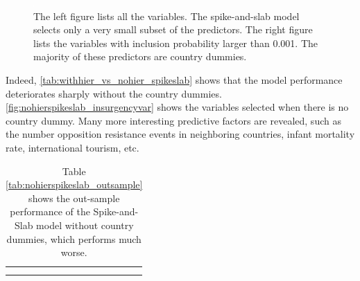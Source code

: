\documentclass{article}
\begin{document}
\begin{figure}[H]
\includegraphics[width=\textwidth]{fig/spikeslab_insurgencyvar}
\caption{The left figure lists all the variables. The spike-and-slab model selects only a very small subset of the predictors. The right figure lists the variables with inclusion probability larger than 0.001. The majority of these predictors are country dummies.}
\label{fig:spikeslab_insurgencyvar}
\end{figure}

Indeed, \autoref{tab:withhier_vs_nohier_spikeslab} shows that the model performance deteriorates sharply without the country dummies. \autoref{fig:nohierspikeslab_insurgencyvar} shows the variables selected when there is no country dummy. Many more interesting predictive factors are revealed, such as the number opposition resistance events in neighboring countries, infant mortality rate, international tourism, etc.

\begin{table}[H]
\centering
\begin{tabular}{c}
\subfloat[With country dummies]{\label{tab:withhierspikeslab_outsample}
	}\\
\subfloat[Without country dummies]{\label{tab:nohierspikeslab_outsample}
	}
\end{tabular}
\caption{Table \autoref{tab:nohierspikeslab_outsample} shows the out-sample performance of the Spike-and-Slab model without country dummies, which performs much worse.}
\label{tab:withhier_vs_nohier_spikeslab}
\end{table}
\end{document}
